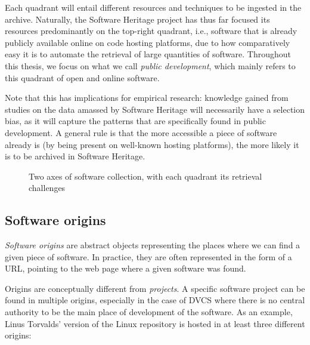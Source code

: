 Each quadrant will entail different resources and techniques to be ingested in
the archive. Naturally, the Software Heritage project has thus far focused its
resources predominantly on the top-right quadrant, i.e., software that is
already publicly available online on code hosting platforms, due to how
comparatively easy it is to automate the retrieval of large quantities of
software.  Throughout this thesis, we focus on what we call \emph{public
development}, which mainly refers to this quadrant of open and online software.

Note that this has implications for empirical research: knowledge gained from
studies on the data amassed by Software Heritage will necessarily have a
selection bias, as it will capture the patterns that are specifically
found in public development. A general rule is that the more accessible a
piece of software already is (by being present on well-known hosting
platforms), the more likely it is to be archived in Software Heritage.

\begin{figure}
    \centering
    \caption{Two axes of software collection, with each quadrant its
    retrieval challenges}%
    \label{fig:swh-collect-axes}
\end{figure}

\subsection{Software origins}

\emph{Software origins} are abstract objects representing the places where we
can find a given piece of software. In practice, they are often represented in
the form of a URL, pointing to the web page where a given software was found.

Origins are conceptually different from \emph{projects}. A specific software
project can be found in multiple origins, especially in the case of \gls{DVCS}
where there is no central authority to be the main place of development of the
software. As an example, Linus Torvalds' version of the Linux repository is
hosted in at least three different origins:

